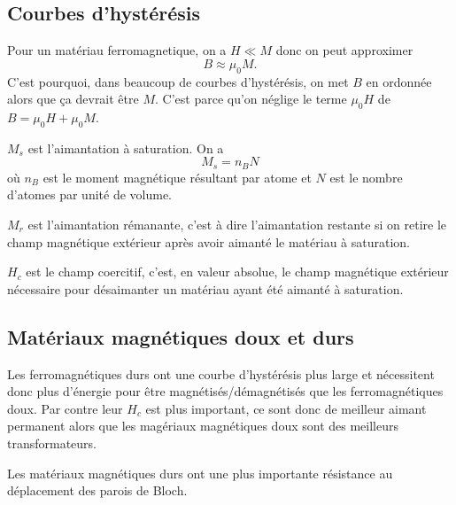 \subsection{Courbes d'hystérésis}
Pour un matériau ferromagnetique, on a $H \ll M$ donc on peut approximer
\[ B \approx \mu_0 M. \]
C'est pourquoi, dans beaucoup de courbes d'hystérésis,
on met $B$ en ordonnée alors que ça devrait être $M$.
C'est parce qu'on néglige le terme $\mu_0 H$ de $B = \mu_0 H + \mu_0 M$.

$M_s$ est l'aimantation à saturation.
On a
\[ M_s = n_B N \]
où $n_B$ est le moment magnétique résultant par atome
et $N$ est le nombre d'atomes par unité de volume.

$M_r$ est l'aimantation rémanante,
c'est à dire l'aimantation restante si on retire le champ magnétique
extérieur après avoir aimanté le matériau à saturation.

$H_c$ est le champ coercitif, c'est, en valeur absolue,
le champ magnétique extérieur nécessaire pour désaimanter
un matériau ayant été aimanté à saturation.

\subsection{Matériaux magnétiques doux et durs}
Les ferromagnétiques durs ont une courbe d'hystérésis plus large et
nécessitent donc plus d'énergie pour
être magnétisés/démagnétisés que les ferromagnétiques doux.
Par contre leur $H_c$ est plus important,
ce sont donc de meilleur aimant permanent alors que
les magériaux magnétiques doux sont des meilleurs transformateurs.

Les matériaux magnétiques durs ont une plus importante
résistance au déplacement des parois de Bloch.

